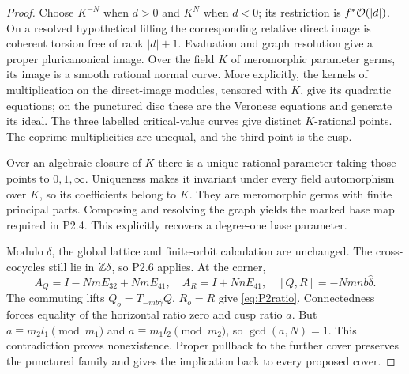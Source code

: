 \begin{proof}
Choose $K^{-N}$ when $d>0$ and $K^N$ when $d<0$; its restriction is $f^*\mathcal O(|d|)$. On a resolved hypothetical filling the corresponding relative direct image is coherent torsion free of rank $|d|+1$. Evaluation and graph resolution give a proper pluricanonical image. Over the field $K$ of meromorphic parameter germs, its image is a smooth rational normal curve. More explicitly, the kernels of multiplication on the direct-image modules, tensored with $K$, give its quadratic equations; on the punctured disc these are the Veronese equations and generate its ideal. The three labelled critical-value curves give distinct $K$-rational points. The coprime multiplicities are unequal, and the third point is the cusp.

Over an algebraic closure of $K$ there is a unique rational parameter taking those points to $0,1,\infty$. Uniqueness makes it invariant under every field automorphism over $K$, so its coefficients belong to $K$. They are meromorphic germs with finite principal parts. Composing and resolving the graph yields the marked base map required in P2.4. This explicitly recovers a degree-one base parameter.

Modulo $\delta$, the global lattice and finite-orbit calculation are unchanged. The cross-cocycles still lie in $\mathbb Z\delta$, so P2.6 applies. At the corner,
\[
 A_Q=I-NmE_{32}+NmE_{41},\quad A_R=I+NnE_{41},\quad [Q,R]=-Nmnb\widehat\delta.
\]
The commuting lifts $Q_o=T_{-mb\widehat\gamma}Q$, $R_o=R$ give \eqref{eq:P2ratio}. Connectedness forces equality of the horizontal ratio zero and cusp ratio $a$. But $a\equiv m_2l_1\pmod{m_1}$ and $a\equiv m_1l_2\pmod{m_2}$, so $\gcd(a,N)=1$. This contradiction proves nonexistence. Proper pullback to the further cover preserves the punctured family and gives the implication back to every proposed cover.
\end{proof}


